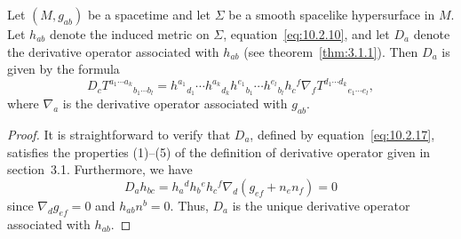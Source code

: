 \begin{lemma}\label{lem:10.2.1}
Let \((M,g_{ab})\) be a spacetime and let \(\Sigma\) be a smooth spacelike
hypersurface in \(M\). Let \(h_{ab}\) denote the induced metric on \(\Sigma\),
equation~\eqref{eq:10.2.10}, and let \(D_a\) denote the derivative operator associated
with \(h_{ab}\) (see theorem~\ref{thm:3.1.1}). Then \(D_a\) is given by the formula
\begin{equation}
  D_cT^{a_1\cdots a_k}{}_{b_1\cdots b_l}
  =h^{a_1}{}_{d_1}\cdots h^{a_k}{}_{d_k}
   h^{e_1}{}_{b_1}\cdots h^{e_l}{}_{b_l}h_c{}^f
   \nabla_fT^{d_1\cdots d_k}{}_{e_1\cdots e_l},
  \tag{10.2.17}\label{eq:10.2.17}
\end{equation}
where \(\nabla_a\) is the derivative operator associated with \(g_{ab}\).
\end{lemma}

\begin{proof}
It is straightforward to verify that \(D_a\), defined by
equation~\eqref{eq:10.2.17}, satisfies the properties (1)--(5) of the definition of
derivative operator given in section~3.1. Furthermore, we have
\begin{equation}
  D_ah_{bc}
  =h_a{}^dh_b{}^eh_c{}^f\nabla_d(g_{ef}+n_en_f)=0
  \tag{10.2.18}\label{eq:10.2.18}
\end{equation}
since \(\nabla_dg_{ef}=0\) and \(h_{ab}n^b=0\). Thus, \(D_a\) is the unique
derivative operator associated with \(h_{ab}\).
\end{proof}

